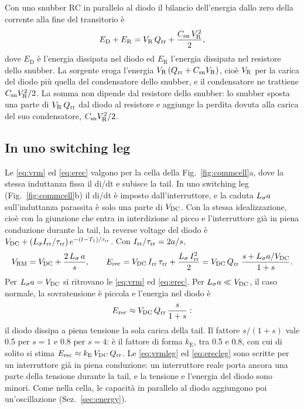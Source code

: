 \documentclass[10pt,a4paper]{scrartcl}
\let\newcommand\pdvaluedefine
\newcommand{\VR}{V_\mathrm{R}}
\newcommand{\Irr}{I_\mathrm{rr}}
\newcommand{\Qrr}{Q_\mathrm{rr}}
\newcommand{\taurr}{\tau_\mathrm{rr}}
\newcommand{\Tone}{T_1}
\newcommand{\Csn}{C_\mathrm{sn}}
\newcommand{\Vrm}{V_\mathrm{RM}}
\newcommand{\Ls}{L_\sigma}                    %
\newcommand{\Vdc}{V_\mathrm{DC}}
\newcommand{\Erec}{E_\mathrm{rec}}
\begin{document}
Con uno snubber RC in parallelo al diodo il bilancio dell'energia dallo zero della corrente alla fine del transitorio è
\begin{equation}
E_\mathrm{D} + E_\mathrm{R} = \VR\,\Qrr + \frac{\Csn\,\VR^2}{2} ,
\label{eq:ebal}
\end{equation}
dove $E_\mathrm{D}$ è l'energia dissipata nel diodo ed $E_\mathrm{R}$ l'energia dissipata nel resistore dello snubber. La sorgente eroga l'energia $\VR\,(\Qrr + \Csn\VR)$, cioè $\VR$ per la carica del diodo più quella del condensatore dello snubber, e il condensatore ne trattiene $\Csn\VR^2/2$. La somma non dipende dal resistore dello snubber: lo snubber sposta una parte di $\VR\,\Qrr$ dal diodo al resistore e aggiunge la perdita dovuta alla carica del suo condensatore, $\Csn\VR^2/2$.

\subsection{In uno switching leg}
\label{sec:switchingleg}
Le \eqref{eq:vrm} ed \eqref{eq:erec} valgono per la cella della Fig.~\ref{fig:commcell}a, dove la stessa induttanza fissa il di/dt e subisce la tail. In uno switching leg (Fig.~\ref{fig:commcell}b) il di/dt è imposto dall'interruttore, e la caduta $\Ls a$ sull'induttanza parassita è solo una parte di $\Vdc$. Con la stessa idealizzazione, cioè con la giunzione che entra in interdizione al picco e l'interruttore già in piena conduzione durante la tail, la reverse voltage del diodo è $\Vdc + (\Ls\Irr/\taurr)\,e^{-(t-\Tone)/\taurr}$. Con $\Irr/\taurr = 2a/s$,
\begin{equation}
\Vrm = \Vdc + \frac{2\,\Ls\,a}{s} , \qquad
\Erec = \Vdc\,\Irr\,\taurr + \frac{\Ls\,\Irr^2}{2} = \Vdc\,\Qrr\;\frac{s + \Ls a/\Vdc}{1+s} .
\label{eq:vrmleg}
\end{equation}
Per $\Ls a = \Vdc$ si ritrovano le \eqref{eq:vrm} ed \eqref{eq:erec}. Per $\Ls a \ll \Vdc$, il caso normale, la sovratensione è piccola e l'energia nel diodo è
\begin{equation}
\Erec \approx \Vdc\,\Qrr\,\frac{s}{1+s} :
\label{eq:erecleg}
\end{equation}
il diodo dissipa a piena tensione la sola carica della tail. Il fattore $s/(1+s)$ vale \num{0.5} per $s = 1$ e \num{0.8} per $s = 4$: è il fattore di forma $k_\mathrm{E}$, tra \num{0.5} e \num{0.8}, con cui di solito si stima $\Erec \approx k_\mathrm{E}\,\Vdc\,\Qrr$. Le \eqref{eq:vrmleg} ed \eqref{eq:erecleg} sono scritte per un interruttore già in piena conduzione: un interruttore reale porta ancora una parte della tensione durante la tail, e la tensione e l'energia del diodo sono minori. Come nella cella, le capacità in parallelo al diodo aggiungono poi un'oscillazione (Sez.~\ref{sec:energy}).
\end{document}
